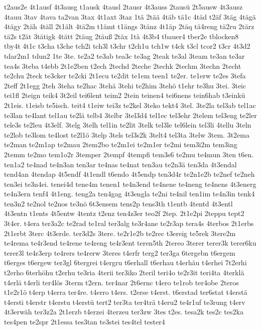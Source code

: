 {t2aus2e
4t1ausf
4t3ausg
t1ausk
4tausl
2tausr
4t3auss
2tausü
2t5ausw
4t3ausz
4tauu
3tav
4tava
ta2van
3tax
4t1axt
3taz
1tä
2tää
4täb
tä1c
4täd
t2äf
3täg
4tägä
4tägy
2täh
4täll
2t1ält
4tä2m
t1ämt
t1ängs
3tänz
4t1äp
2täq
tä4reng
tä2ru
2tärz
tä2s
t2ät
3tätigk
4tätt
2täug
2täuß
2täx
1tà
4t3b4
tbauer4
tber2e
tblocken8
tby4t
4t1c
t3cha
t3che
tch2i
tch3l
t3chr
t2ch1u
tch1w
t4ck
t3cl
tcor2
t3cr
4t3d2
tdar2m1
tdun2
1te
3te.
te2a2
te3ab
tea3c
te3ag
2teak
te3al
3team
te3an
te3ar
tea4s
3teba
t4ebb
2t1e2ben
t2ech
2techd
2teche
2techk
2techm
3techn
2techt
te2chu
2teck
te3cker
te2cki
2t1ecu
te2dit
te1em
teen1
te2er.
te1erw
te2es
3tefa
2teff
2t1egg
2teh
3teha
te2hac
3tehä
3tehi
te2him
3tehö
t1ehr
te3hu
3tei.
3teic
tei1fl
2teign
teik4
3t2eil
tei6lent
teim2
2tein
teinen4
tei6nens
tein6hab
t3einkü
2t1eis.
t1eisb
te5isch.
teit4
t1eiw
tei3z
te2kel
3teko
tekt4
3tel.
3te2la
tel3ab
tel1ac
te3lan
te4lant
tel1au
te2lä
telb4
3telbr
3tel3d4
tel1ec
tel3ehr
2telem
tel3eng
te2ler
tele3s
te2leu
4t3elf.
3telg
3telh
tel1in
te2lit
3telk
tel3le
tel6lein
tel3li
4tellu
3teln
te2lob
te3lom
te4lost
te2l1ö
3telp
3tels
tel3s2k
3telt4
tel3ta
3telw
3tem.
3t2ema
te2man
te2m1ap
te2mau
2tem2bo
te2m1ei
te2m1er
te2mi
tem3i2m
tem3ing
2temm
te2mo
tem1o2r
3temper
2tempf
4tempfi
tem3s6
te2mu
te4mun
3ten
t6en.
ten1a2
te4nad
te4n3an
ten3ar
te4nas
te4nat
ten3au
te2n3ä
ten3da
4t3endal
tend4an
4tendap
4t5endf
4t1endl
t6endo
4t5endp
ten3d4r
te2n1e2b
te2nef
te2neh
ten3ei
te3n4ei.
tenei4d
tene4m
tenen1
te4n3end
te4nene
te4neng
te4nens
4t3energ
te4n3ern
tenf4
4t1eng.
teng2a
ten4gag
4t3engla
te2ni
te4nil
ten1im
te4n3in
tenk4
ten3n2
te2nol
te2nos
te3nö
6t3ensem
tens2p
tens3th
t1entb
4tentd
4t3entl
4t3entn
t1ents
4t5entw
4tentz
t2enz
ten4z3er
teo2f
2tep.
2t1e2pi
2teppu
tept2
3t4er.
t4era
ter3a2c
te2rad
te1ral
ter3alg
te3r4ane
te2r3ap
tera4s
4terbos
2t1erbs
2t1erbt
3terc
4t3erde.
ter3d2s
3tere.
te2r1e2b
te2rec
t3ereig
te5rek
3tere2m
te4rema
te4r3end
te4rene
te4reng
te4r3ent
teren5th
2tereo
3terer
terer3k
terer6ku
terer3l
te4r3erp
te4rers
te4rerw
3teres
t4erfr
terg2
ter3ga
6tergebn
t6ergem
t6erges
t6ergew
ter3gl
6tergrei
t4ergru
t6erhall
t6erhau
t4erhäu
t4erhei
7t2erhi
t2erho
6terhöhu
t2erhu
te3ria
4terii
ter3iko
2teril
teri4o
te2r3it
teri4ta
4terklä
t4erlä
t4erli
ter4lös
3term
t2ern.
ter4nar
2t6ernc
t4ero
te1rob
ter4obe
2teros
t1e2r1ö
t4erp
t4erra
ter4re.
t4erro
t4ers.
t2erse
t4erst.
t6erstad
ter6stat
t4erstä
t4ersti
t4erstr
t4erstu
t4erstü
tert2
ter3ta
ter4trä
t4eru2
te4r1uf
te3rung
t4erv
4t3erwäh
ter3z2a
2t1erzb
t4erzei
4terzeu
ter3zw
3tes
t2es.
tesa2k
tes2c
tes2ka
tes4pen
te2spr
2t1essa
tes3tan
te3stei
tes4tel
tester4
}
